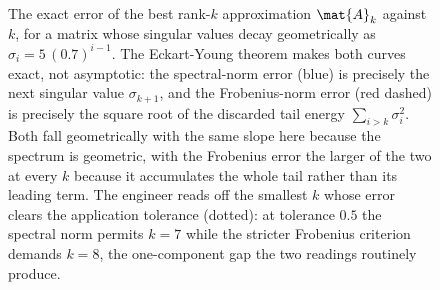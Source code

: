 \begin{figure}[htbp]
\centering
{}
\caption[Eckart-Young truncation error in two norms]{The exact error
of the best rank-$k$ approximation $\mat{A}_k$ against $k$, for a
matrix whose singular values decay geometrically as $\sigma_i =
5\,(0.7)^{i-1}$. The Eckart-Young theorem makes both curves exact,
not asymptotic: the spectral-norm error (blue) is precisely the next
singular value $\sigma_{k+1}$, and the Frobenius-norm error (red
dashed) is precisely the square root of the discarded tail energy
$\sum_{i>k}\sigma_i^2$. Both fall geometrically with the same slope
here because the spectrum is geometric, with the Frobenius error the
larger of the two at every $k$ because it accumulates the whole tail
rather than its leading term. The engineer reads off the smallest $k$
whose error clears the application tolerance (dotted): at tolerance
$0.5$ the spectral norm permits $k = 7$ while the stricter Frobenius
criterion demands $k = 8$, the one-component gap the two readings
routinely produce.}
\label{fig:vol02:ch10:eckart-young-error}
\end{figure}
